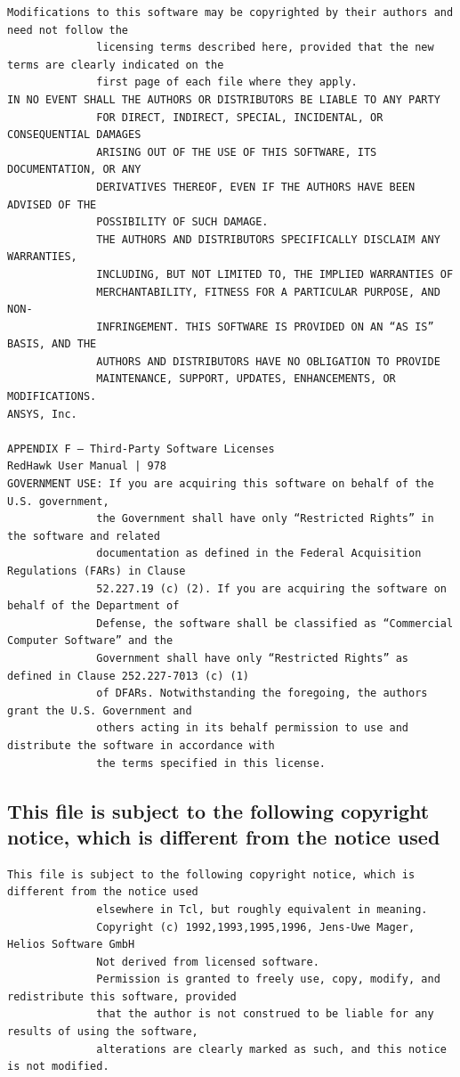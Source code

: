 \begin{lstlisting}[basicstyle=\ttfamily\scriptsize,breaklines=true]
              Modifications to this software may be copyrighted by their authors and need not follow the
              licensing terms described here, provided that the new terms are clearly indicated on the
              first page of each file where they apply.
IN NO EVENT SHALL THE AUTHORS OR DISTRIBUTORS BE LIABLE TO ANY PARTY
              FOR DIRECT, INDIRECT, SPECIAL, INCIDENTAL, OR CONSEQUENTIAL DAMAGES
              ARISING OUT OF THE USE OF THIS SOFTWARE, ITS DOCUMENTATION, OR ANY
              DERIVATIVES THEREOF, EVEN IF THE AUTHORS HAVE BEEN ADVISED OF THE
              POSSIBILITY OF SUCH DAMAGE.
              THE AUTHORS AND DISTRIBUTORS SPECIFICALLY DISCLAIM ANY WARRANTIES,
              INCLUDING, BUT NOT LIMITED TO, THE IMPLIED WARRANTIES OF
              MERCHANTABILITY, FITNESS FOR A PARTICULAR PURPOSE, AND NON-
              INFRINGEMENT. THIS SOFTWARE IS PROVIDED ON AN “AS IS” BASIS, AND THE
              AUTHORS AND DISTRIBUTORS HAVE NO OBLIGATION TO PROVIDE
              MAINTENANCE, SUPPORT, UPDATES, ENHANCEMENTS, OR MODIFICATIONS.
ANSYS, Inc.

APPENDIX F — Third-Party Software Licenses                                     RedHawk User Manual | 978
GOVERNMENT USE: If you are acquiring this software on behalf of the U.S. government,
              the Government shall have only “Restricted Rights” in the software and related
              documentation as defined in the Federal Acquisition Regulations (FARs) in Clause
              52.227.19 (c) (2). If you are acquiring the software on behalf of the Department of
              Defense, the software shall be classified as “Commercial Computer Software” and the
              Government shall have only “Restricted Rights” as defined in Clause 252.227-7013 (c) (1)
              of DFARs. Notwithstanding the foregoing, the authors grant the U.S. Government and
              others acting in its behalf permission to use and distribute the software in accordance with
              the terms specified in this license.
\end{lstlisting}

\subsection{This file is subject to the following copyright notice, which is different from the notice used}

\begin{lstlisting}[basicstyle=\ttfamily\scriptsize,breaklines=true]
This file is subject to the following copyright notice, which is different from the notice used
              elsewhere in Tcl, but roughly equivalent in meaning.
              Copyright (c) 1992,1993,1995,1996, Jens-Uwe Mager, Helios Software GmbH
              Not derived from licensed software.
              Permission is granted to freely use, copy, modify, and redistribute this software, provided
              that the author is not construed to be liable for any results of using the software,
              alterations are clearly marked as such, and this notice is not modified.
\end{lstlisting}

